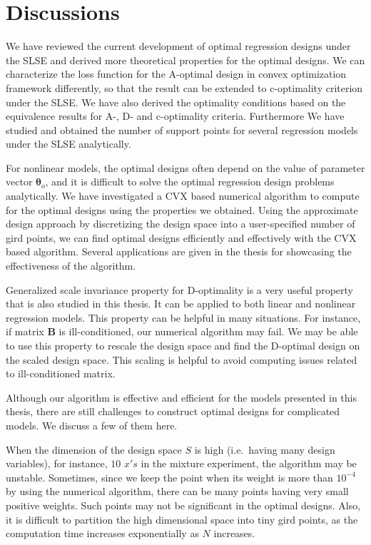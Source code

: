 \documentclass[
]{book}
\theoremstyle{definition}
\theoremstyle{definition}
\theoremstyle{definition}
\theoremstyle{definition}
\theoremstyle{remark}
\begin{document}
\chapter{Discussions}\label{chapter:discussions}

We have reviewed the current development of optimal regression designs under the SLSE and derived more theoretical properties for the optimal designs. We can characterize the loss function for the A-optimal design in convex optimization framework differently, so that the result can be extended to c-optimality criterion under the SLSE. We have also derived the optimality conditions based on the equivalence results for A-, D- and c-optimality criteria. Furthermore We have studied and obtained the number of support points for several regression models under the SLSE analytically.

For nonlinear models, the optimal designs often depend on the value of parameter vector \(\boldsymbol{\theta}_o\), and it is difficult to solve the optimal regression design problems analytically. We have investigated a CVX based numerical algorithm to compute for the optimal designs using the properties we obtained. Using the approximate design approach by discretizing the design space into a user-specified number of gird points, we can find optimal designs efficiently and effectively with the CVX based algorithm. Several applications are given in the thesis for showcasing the effectiveness of the algorithm.

Generalized scale invariance property for D-optimality is a very useful property that is also studied in this thesis. It can be applied to both linear and nonlinear regression models. This property can be helpful in many situations. For instance, if matrix \(\boldsymbol{B}\) is ill-conditioned, our numerical algorithm may fail. We may be able to use this property to rescale the design space and find the D-optimal design on the scaled design space. This scaling is helpful to avoid computing issues related to ill-conditioned matrix.

Although our algorithm is effective and efficient for the models presented in this thesis, there are still challenges to construct optimal designs for complicated models. We discuss a few of them here.

When the dimension of the design space \(S\) is high (i.e.~having many design variables), for instance, \(10\) \(x's\) in the mixture experiment, the algorithm may be unstable. Sometimes, since we keep the point when its weight is more than \(10^{-4}\) by using the numerical algorithm, there can be many points having very small positive weights. Such points may not be significant in the optimal designs. Also, it is difficult to partition the high dimensional space into tiny gird points, as the computation time increases exponentially as \(N\) increases.
\end{document}
